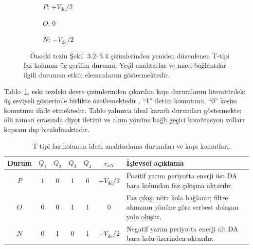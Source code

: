 \begin{figure}[htbp]
  \centering
  \begin{subfigure}[t]{0.32\textwidth}
    \centering
    \caption{$P$: $+V_{\mathrm{dc}}/2$}
  \end{subfigure}\hfill
  \begin{subfigure}[t]{0.32\textwidth}
    \centering
    \caption{$O$: $0$}
  \end{subfigure}\hfill
  \begin{subfigure}[t]{0.32\textwidth}
    \centering
    \caption{$N$: $-V_{\mathrm{dc}}/2$}
  \end{subfigure}
  \caption{\eskitezetiketi\ \juriistegietiketi\ Önceki tezin Şekil~3.2--3.4 çizimlerinden yeniden düzenlenen T-tipi faz kolunun üç gerilim durumu. Yeşil anahtarlar ve mavi bağlantılar ilgili durumun etkin elemanlarını göstermektedir.}
  \label{fig:t-tipi-uc-seviye}
\end{figure}

Tablo~\ref{tab:t-tipi-durumlar}, eski tezdeki devre çizimlerinden çıkarılan kapı durumlarını literatürdeki üç seviyeli gösterimle birlikte özetlemektedir \citep{Holmes2003,Wang2020}. ``1'' iletim komutunu, ``0'' kesim komutunu ifade etmektedir. Tablo yalnızca ideal kararlı durumları göstermekte; ölü zaman sırasında diyot iletimi ve akım yönüne bağlı geçici komütasyon yolları kapsam dışı bırakılmaktadır.

\begin{table}[htbp]
  \centering
  \caption{\eskitezetiketi\ \diskaynaketiketi\ \juriistegietiketi\ T-tipi faz kolunun ideal anahtarlama durumları ve kapı komutları.}
  \label{tab:t-tipi-durumlar}
  \small
  \begin{tabularx}{\textwidth}{c c c c c c X}
    \toprule
    Durum & $Q_1$ & $Q_2$ & $Q_3$ & $Q_4$ & $v_{xN}$ & İşlevsel açıklama \\
    \midrule
    $P$ & 1 & 0 & 1 & 0 & $+V_{\mathrm{dc}}/2$ & Pozitif yarım periyotta enerji üst DA bara kolundan faz çıkışına aktarılır. \\
    $O$ & 0 & 0 & 1 & 1 & $0$ & Faz çıkışı nötr kola bağlanır; filtre akımının yönüne göre serbest dolaşım yolu oluşur. \\
    $N$ & 0 & 1 & 0 & 1 & $-V_{\mathrm{dc}}/2$ & Negatif yarım periyotta enerji alt DA bara kolu üzerinden aktarılır. \\
    \bottomrule
  \end{tabularx}
\end{table}

